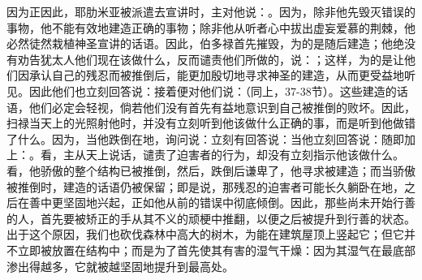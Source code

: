 因为正因此，耶肋米亚被派遣去宣讲时，主对他说：。因为，除非他先毁灭错误的事物，他不能有效地建造正确的事物；除非他从听者心中拔出虚妄爱慕的荆棘，他必然徒然栽植神圣宣讲的话语。因此，伯多禄首先摧毁，为的是随后建造；他绝没有劝告犹太人他们现在该做什么，反而谴责他们所做的，说：；这样，为的是让他们因承认自己的残忍而被推倒后，能更加殷切地寻求神圣的建造，从而更受益地听见。因此他们也立刻回答说：接着便对他们说：（同上，37-38节）。这些建造的话语，他们必定会轻视，倘若他们没有首先有益地意识到自己被推倒的败坏。因此，扫禄当天上的光照射他时，并没有立刻听到他该做什么正确的事，而是听到他做错了什么。因为，当他跌倒在地，询问说：立刻有回答说：当他立刻回答说：随即加上：。看，主从天上说话，谴责了迫害者的行为，却没有立刻指示他该做什么。看，他骄傲的整个结构已被推倒，然后，跌倒后谦卑了，他寻求被建造；而当骄傲被推倒时，建造的话语仍被保留；即是说，那残忍的迫害者可能长久躺卧在地，之后在善中更坚固地兴起，正如他从前的错误中彻底倾倒。因此，那些尚未开始行善的人，首先要被矫正的手从其不义的顽梗中推翻，以便之后被提升到行善的状态。出于这个原因，我们也砍伐森林中高大的树木，为能在建筑屋顶上竖起它；但它并不立即被放置在结构中；而是为了首先使其有害的湿气干燥：因为其湿气在最底部渗出得越多，它就被越坚固地提升到最高处。\par

